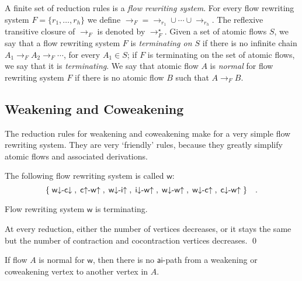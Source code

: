 \documentclass[a4paper]{LMCS}
\begin{document}
\begin{defi}
A finite set of reduction rules is a \emph{flow rewriting system}. For every flow rewriting system $F=\{r_1,\dots,r_h\}$ we define ${\to_F}={\to_{r_1}\cup\cdots\cup{\to_{r_h}}}$. The reflexive transitive closure of $\to_F$ is denoted by $\to_F^\star$. Given a set of atomic flows $S$, we say that a flow rewriting system $F$ is \emph{terminating on $S$} if there is no infinite chain $A_1\to_F A_2\to_F\cdots$, for every $A_1\in S$; if $F$ is terminating on the set of atomic flows, we say that it is \emph{terminating}. We say that atomic flow $A$ is \emph{normal} for flow rewriting system $F$ if there is no atomic flow $B$ such that $A\to_F B$.
\end{defi}

\subsection{Weakening and Coweakening}\label{SubsWeak}

The reduction rules for weakening and coweakening make for a very simple flow rewriting system. They are very `friendly' rules, because they greatly simplify atomic flows and associated derivations.

\begin{defi}
The following flow rewriting system is called ${{\mathsf w}}$:
\[
\{\;{{{\mathsf w}{\downarrow}{\hbox{-}}{\mathsf c}{\downarrow}}}\;,\;{{{\mathsf c}{\uparrow  }{\hbox{-}}{\mathsf w}{\uparrow  }}}\;,\;{{{\mathsf w}{\downarrow}{\hbox{-}}{\mathsf i}{\uparrow  }}}\;,\;{{{\mathsf i}{\downarrow}{\hbox{-}}{\mathsf w}{\uparrow  }}}\;,\;{{{\mathsf w}{\downarrow}{\hbox{-}}{\mathsf w}{\uparrow  }}}\;,\;{{{\mathsf w}{\downarrow}{\hbox{-}}{\mathsf c}{\uparrow  }}}\;,\;{{{\mathsf c}{\downarrow}{\hbox{-}}{\mathsf w}{\uparrow  }}}\;\}
\quad.
\]
\end{defi}

\begin{thm}\label{TheoWTerm}
Flow rewriting system\/ ${{\mathsf w}}$ is terminating.
\end{thm}

\proof
At every reduction, either the number of vertices decreases, or it stays the same but the number of contraction and cocontraction vertices decreases.
\qed

\begin{rem}\label{RemNDCW}
If flow $A$ is normal for ${{\mathsf w}}$, then there is no ${\mathsf{ai}}$-path from a weakening or coweakening vertex to another vertex in $A$.
\end{rem}
\end{document}
